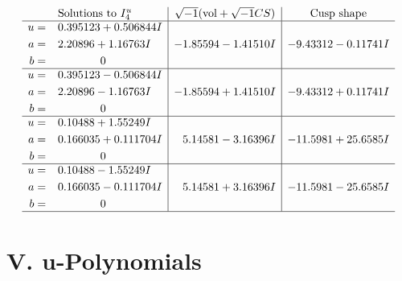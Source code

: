 \documentclass[1p]{elsarticle_modified}
\theoremstyle{definition}
\newcommand{\I}{\sqrt{-1}}
\begin{document}
$$\begin{array}{c|c|c}  
\text{Solutions to }I^u_{4}& \I (\text{vol} + \sqrt{-1}CS) & \text{Cusp shape}\\
 \hline 
\begin{aligned}
u &= \phantom{-}0.395123 + 0.506844 I \\
a &= \phantom{-}2.20896 + 1.16763 I \\
b &= \phantom{-0.000000 } 0\end{aligned}
 & -1.85594 - 1.41510 I & -9.43312 - 0.11741 I \\ \hline\begin{aligned}
u &= \phantom{-}0.395123 - 0.506844 I \\
a &= \phantom{-}2.20896 - 1.16763 I \\
b &= \phantom{-0.000000 } 0\end{aligned}
 & -1.85594 + 1.41510 I & -9.43312 + 0.11741 I \\ \hline\begin{aligned}
u &= \phantom{-}0.10488 + 1.55249 I \\
a &= \phantom{-}0.166035 + 0.111704 I \\
b &= \phantom{-0.000000 } 0\end{aligned}
 & \phantom{-}5.14581 - 3.16396 I & -11.5981 + 25.6585 I \\ \hline\begin{aligned}
u &= \phantom{-}0.10488 - 1.55249 I \\
a &= \phantom{-}0.166035 - 0.111704 I \\
b &= \phantom{-0.000000 } 0\end{aligned}
 & \phantom{-}5.14581 + 3.16396 I & -11.5981 - 25.6585 I\\
 \hline 
 \end{array}$$\newpage
\newpage\renewcommand{\arraystretch}{1}
\centering \section*{ V. u-Polynomials}
\end{document}

